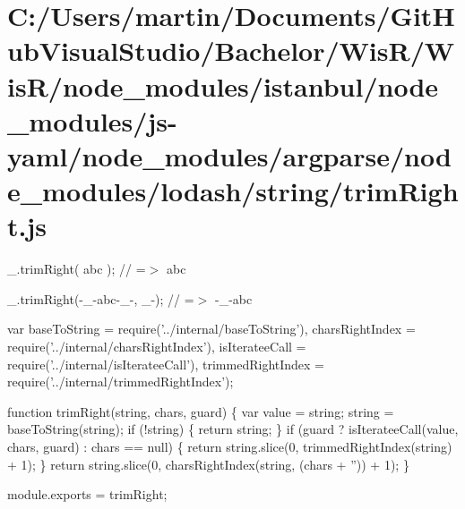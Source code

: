 \hypertarget{_c_1_2_users_2martin_2_documents_2_git_hub_visual_studio_2_bachelor_2_wis_r_2_wis_r_2node_module0306d36b01b75f2794d83166ebde19f9}{}\section{C\+:/\+Users/martin/\+Documents/\+Git\+Hub\+Visual\+Studio/\+Bachelor/\+Wis\+R/\+Wis\+R/node\+\_\+modules/istanbul/node\+\_\+modules/js-\/yaml/node\+\_\+modules/argparse/node\+\_\+modules/lodash/string/trim\+Right.\+js}
\+\_\+.\+trim\+Right(\textquotesingle{} abc \textquotesingle{}); // =$>$ \textquotesingle{} abc\textquotesingle{}

\+\_\+.\+trim\+Right(\textquotesingle{}-\/\+\_\+-\/abc-\/\+\_\+-\/\textquotesingle{}, \textquotesingle{}\+\_\+-\/\textquotesingle{}); // =$>$ \textquotesingle{}-\/\+\_\+-\/abc\textquotesingle{}


\begin{DoxyCodeInclude}
var baseToString = require(\textcolor{stringliteral}{'../internal/baseToString'}),
    charsRightIndex = require(\textcolor{stringliteral}{'../internal/charsRightIndex'}),
    isIterateeCall = require(\textcolor{stringliteral}{'../internal/isIterateeCall'}),
    trimmedRightIndex = require(\textcolor{stringliteral}{'../internal/trimmedRightIndex'});

\textcolor{keyword}{function} trimRight(\textcolor{keywordtype}{string}, chars, guard) \{
  var value = string;
  \textcolor{keywordtype}{string} = baseToString(\textcolor{keywordtype}{string});
  \textcolor{keywordflow}{if} (!\textcolor{keywordtype}{string}) \{
    \textcolor{keywordflow}{return} string;
  \}
  \textcolor{keywordflow}{if} (guard ? isIterateeCall(value, chars, guard) : chars == null) \{
    \textcolor{keywordflow}{return} \textcolor{keywordtype}{string}.slice(0, trimmedRightIndex(\textcolor{keywordtype}{string}) + 1);
  \}
  \textcolor{keywordflow}{return} \textcolor{keywordtype}{string}.slice(0, charsRightIndex(\textcolor{keywordtype}{string}, (chars + \textcolor{stringliteral}{''})) + 1);
\}

module.exports = trimRight;
\end{DoxyCodeInclude}
 